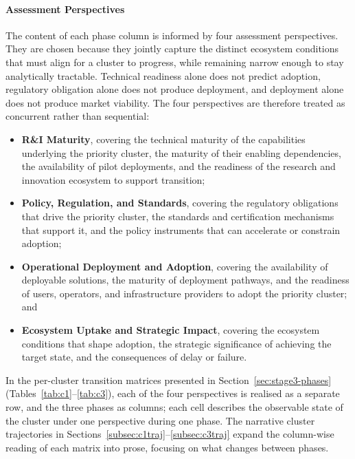 \documentclass{ieeeaccess}
\begin{document}
\paragraph{Assessment Perspectives}
The content of each phase column is informed by four assessment perspectives. They are chosen because they jointly capture the distinct ecosystem conditions that must align for a cluster to progress, while remaining narrow enough to stay analytically tractable. Technical readiness alone does not predict adoption, regulatory obligation alone does not produce deployment, and deployment alone does not produce market viability. The four perspectives are therefore treated as concurrent rather than sequential:
\begin{itemize}
  \item \textbf{R\&I Maturity}, covering the technical maturity of the capabilities underlying the priority cluster, the maturity of their enabling dependencies, the availability of pilot deployments, and the readiness of the research and innovation ecosystem to support transition;
  \item \textbf{Policy, Regulation, and Standards}, covering the regulatory obligations that drive the priority cluster, the standards and certification mechanisms that support it, and the policy instruments that can accelerate or constrain adoption;
  \item \textbf{Operational Deployment and Adoption}, covering the availability of deployable solutions, the maturity of deployment pathways, and the readiness of users, operators, and infrastructure providers to adopt the priority cluster; and
  \item \textbf{Ecosystem Uptake and Strategic Impact}, covering the ecosystem conditions that shape adoption, the strategic significance of achieving the target state, and the consequences of delay or failure.
\end{itemize}

In the per-cluster transition matrices presented in Section~\ref{sec:stage3-phases} (Tables~\ref{tab:c1}--\ref{tab:c3}), each of the four perspectives is realised as a separate row, and the three phases as columns; each cell describes the observable state of the cluster under one perspective during one phase. The narrative cluster trajectories in Sections~\ref{subsec:c1traj}--\ref{subsec:c3traj} expand the column-wise reading of each matrix into prose, focusing on what changes between phases.
\end{document}
